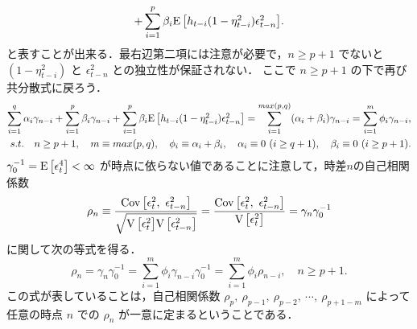 \documentclass[8pt]{jsarticle}
\def\Exp#1{\mbox{${\rm E} \left[ #1 \right]$}}
\def\Var#1{\mbox{${\rm V} \left[ #1 \right]$}}
\def\Cov#1#2{\mbox{${\rm Cov} \left[ #1,\ #2 \right]$}}
\begin{document}
\begin{breakbox}
\begin{align*}
			+ \sum_{i=1}^{p} \beta_i \Exp{h_{t-i}(1 - \eta_{t-i}^2) \epsilon_{t-n}^2}.
	\end{align*}
	と表すことが出来る．最右辺第二項には注意が必要で，$n \geq p+1$ でないと $(1 - \eta_{t-i}^2)$ と $\epsilon_{t-n}^2$ との独立性が保証されない．
	ここで $n \geq p+1$ の下で再び共分散式に戻ろう．
	\begin{align*}
		\sum_{i=1}^{q} \alpha_i \gamma_{n - i} 
			+ \sum_{i=1}^{p} \beta_i \gamma_{n - i} 
			+ \sum_{i=1}^{p} \beta_i \Exp{h_{t-i}(1 - \eta_{t-i}^2) \epsilon_{t-n}^2} 
		= \sum_{i=1}^{max(p, q)} (\alpha_i + \beta_i) \gamma_{n - i}
		= \sum_{i=1}^{m} \phi_i \gamma_{n - i}, \\
		s.t.\quad n \geq p+1,\quad m \equiv max(p, q),\quad \phi_i \equiv \alpha_i + \beta_i,\quad \alpha_i \equiv 0\ (i \geq q+1),\quad \beta_i \equiv 0\ (i \geq p+1).
	\end{align*}
	$\gamma_0^{-1} = \Exp{\epsilon_t^4} < \infty$ が時点に依らない値であることに注意して，時差$n$の自己相関係数 
	\[
		\rho_n \equiv \frac{\Cov{\epsilon_t^2}{\epsilon_{t-n}^2}}{\sqrt{\Var{\epsilon_t^2}\Var{\epsilon_{t-n}^2}}} 
		= \frac{\Cov{\epsilon_t^2}{\epsilon_{t-n}^2}}{\Var{\epsilon_t^2}} 
		= \gamma_n \gamma_0^{-1}
	\]
	に関して次の等式を得る．
	\[
		\rho_n = \gamma_n \gamma_0^{-1} = \sum_{i=1}^{m} \phi_i \gamma_{n - i} \gamma_0^{-1} = \sum_{i=1}^{m} \phi_i \rho_{n - i},\quad  n \geq p+1.
	\]
	この式が表していることは，自己相関係数 $\rho_{p},\ \rho_{p-1},\ \rho_{p-2},\ \cdots,\ \rho_{p+1-m}$ によって任意の時点 $n$ での $\rho_n$ が一意に定まるということである．\\
\end{breakbox}
\end{document}

